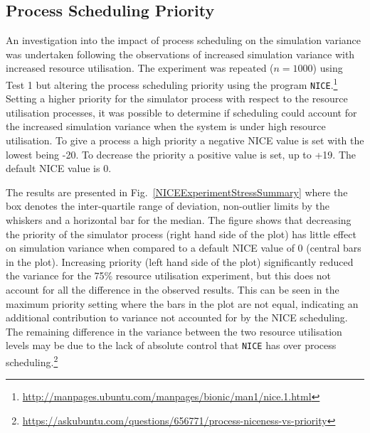 \DIFaddbegin 

\DIFaddend \subsection{Process Scheduling Priority} \label{r:process_scheduling}


An investigation into the impact of process scheduling on the simulation variance was undertaken following the observations of increased simulation variance with increased resource utilisation. The experiment was repeated ($n=1000$) using Test 1 but altering the process scheduling priority using the program \texttt{NICE}.\footnote{\url{http://manpages.ubuntu.com/manpages/bionic/man1/nice.1.html}} Setting a higher priority for the simulator process with respect to the resource utilisation processes, it was possible to determine if scheduling could account for the increased simulation variance when the system is under high resource utilisation.
%
To give a process a high priority a negative NICE value is set with the lowest being -20. To decrease the priority a positive value is set, up to +19. The default NICE value is 0.

The results are presented in Fig.~\ref{NICEExperimentStressSummary} where the box denotes the inter-quartile range of deviation, non-outlier limits by the whiskers and a horizontal bar for the median. The figure shows that decreasing the priority of the simulator process (right hand side of the  plot) has little effect on simulation variance when compared to a default NICE value of 0 (central bars in the plot). Increasing priority (left hand side of the plot) significantly reduced the variance for the 75\% resource utilisation experiment, but this does not account for all the difference in the observed results. This can be seen in the maximum priority setting where the bars in the plot are not equal, indicating an additional contribution to variance not accounted for by the NICE scheduling. 
%
The remaining difference in the variance between the two resource utilisation levels may be due to the lack of absolute control that \texttt{NICE} has over process scheduling.\footnote{\url{https://askubuntu.com/questions/656771/process-niceness-vs-priority}}



\DIFaddbegin 

